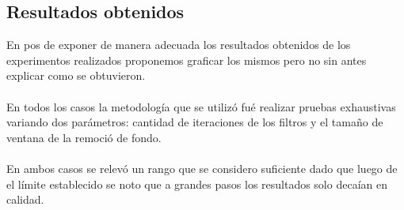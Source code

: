\subsection{Resultados obtenidos}

En pos de exponer de manera adecuada los resultados obtenidos de los experimentos realizados proponemos graficar los mismos pero no sin antes explicar como se obtuvieron.
\paragraph{}
En todos los casos la metodolog\'ia que se utiliz\'o fu\'e realizar pruebas exhaustivas variando dos par\'ametros: cantidad de iteraciones de los filtros y el tamaño de ventana de la remoci\'o de fondo.
\paragraph{}
En ambos casos se relev\'o un rango que se considero suficiente dado que luego de el límite establecido se noto que a grandes pasos los resultados solo deca\'ian en calidad.

